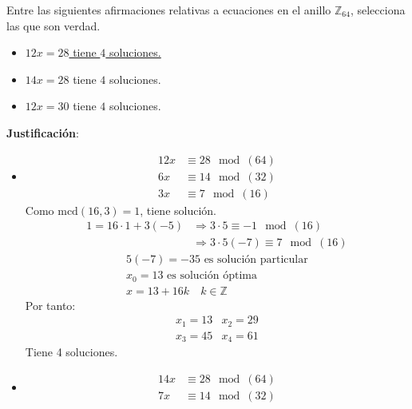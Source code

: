 \begin{ejercicio}
    Entre las siguientes afirmaciones relativas a ecuaciones en el anillo $\mathbb{Z}_{64}$, selecciona las que son verdad.
    \begin{itemize}
        \item \underline{$12x=28$ tiene $4$ soluciones.}
        \item $14x=28$ tiene $4$ soluciones.
        \item $12x=30$ tiene $4$ soluciones.
    \end{itemize}

    \noindent
    \textbf{Justificación}:
    \begin{itemize}
        \item 
            \begin{align*}
                12x &\equiv 28\mod(64)\\
                6x &\equiv 14\mod(32) \\
                3x &\equiv 7\mod(16)
            \end{align*}
            Como $\text{mcd}(16,3)=1$, tiene solución.
            \begin{align*}
                1 = 16\cdot 1 + 3(-5) &\Longrightarrow 3\cdot 5\equiv -1\mod(16) \\
                                      &\Longrightarrow 3\cdot 5(-7)\equiv 7\mod(16)
            \end{align*}
            \begin{gather*}
                5(-7) = -35 \text{\ es\ solución\ particular} \\
                x_0 = 13 \text{\ es\ solución\ óptima} \\
                x = 13 + 16k\quad k\in \mathbb{Z}
            \end{gather*}
            Por tanto:
            \begin{equation*}
                \begin{array}{ll}
                    x_1 = 13 & x_2 = 29 \\
                    x_3 = 45 & x_4 = 61
                \end{array}
            \end{equation*}
            Tiene 4 soluciones.
        \item 
            \begin{align*}
                14x &\equiv 28\mod(64) \\
                7x &\equiv 14\mod(32)
            \end{align*}

\end{itemize}
\end{ejercicio}
